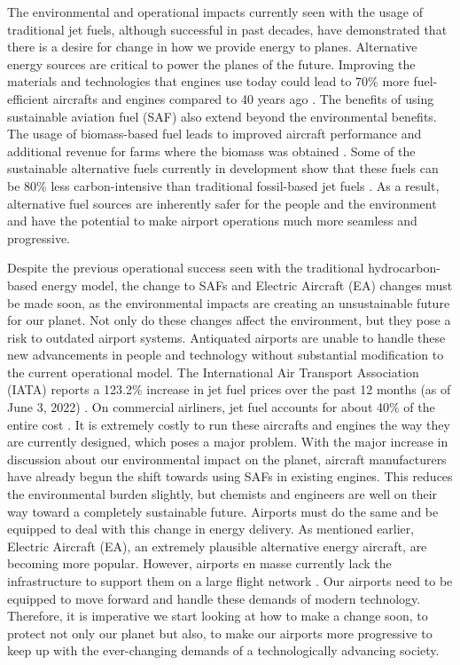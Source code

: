 \documentclass[../main.tex]{subfiles}
\begin{document}
The environmental and operational impacts currently seen with the usage of traditional jet fuels, although successful in past decades, have demonstrated that there is a desire for change in how we provide energy to planes. Alternative energy sources are critical to power the planes of the future. Improving the materials and technologies that engines use today could lead to 70\% more fuel-efficient aircrafts and engines compared to 40 years ago \cite{ref21}. The benefits of using sustainable aviation fuel (SAF) also extend beyond the environmental benefits. The usage of biomass-based fuel leads to improved aircraft performance and additional revenue for farms where the biomass was obtained \cite{ref18}. Some of the sustainable alternative fuels currently in development show that these fuels can be 80\% less carbon-intensive  than traditional fossil-based jet fuels \cite{ref22}. As a result, alternative fuel sources are inherently safer for the people and the environment and have the potential to make airport operations much more seamless and progressive. \par 
Despite the previous operational success seen with the traditional hydrocarbon-based energy model, the change to SAFs and Electric Aircraft (EA) changes must be made soon, as the environmental impacts are creating an unsustainable future for our planet. Not only do these changes affect the environment, but they pose a risk to outdated airport systems. Antiquated airports are unable to handle these new advancements in people and technology without substantial modification to the current operational model. The International Air Transport Association (IATA) reports a 123.2\% increase in jet fuel prices over the past 12 months (as of June 3, 2022) \cite{ref7}. On commercial airliners, jet fuel accounts for about 40\% of the entire cost \cite{ref23}.  It is extremely costly to run these aircrafts and engines the way they are currently designed, which poses a major problem.   With the major increase in discussion about our environmental impact on the planet, aircraft manufacturers have already begun the shift towards using SAFs in existing engines. This reduces the environmental burden slightly, but chemists and engineers are well on their way toward a completely sustainable future.  Airports must do the same and be equipped to deal with this change in energy delivery. As mentioned earlier, Electric Aircraft (EA), an extremely plausible alternative energy aircraft, are becoming more popular. However, airports en masse currently lack the infrastructure to support them on a large flight network \cite{ref9}. Our airports need to be equipped to move forward and handle these demands of modern technology. Therefore, it is imperative we start looking at how to make a change soon, to protect not only our planet but also, to make our airports more progressive to keep up with the ever-changing demands of a technologically advancing society.\par  
\end{document}
